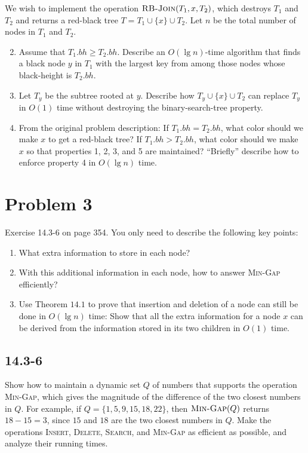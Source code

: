 \documentclass{../../class}
\begin{document}
We wish to implement the operation $\textsc{RB-Join}(T_1, x, T_2)$, which destroys $T_1$ and $T_2$ and returns a red-black tree $T = T_1 \cup \{x\} \cup T_2$. Let $n$ be the total number of nodes in $T_1$ and $T_2$.
\begin{enumerate}[label=\textbf{\textit{\alph*}}.] \setcounter{enumi}{1}
    \item Assume that $T_1.bh \geq T_2.bh$. Describe an $O(\lg{n})$-time algorithm that finds a black node $y$ in $T_1$ with the largest key from among those nodes whose black-height is $T_2.bh$.
    \item Let $T_y$ be the subtree rooted at $y$. Describe how $T_y \cup \{x\} \cup T_2$ can replace $T_y$ in $O(1)$ time without destroying the binary-search-tree property.
    \item From the original problem description: If $T_1.bh = T_2.bh$, what color should we make $x$ to get a red-black tree? If $T_1.bh > T_2.bh$, what color should we make $x$ so that properties 1, 2, 3, and 5 are maintained? \enquote{Briefly} describe how to enforce property 4 in $O(\lg{n})$ time.
\end{enumerate}

\newpage
\section*{Problem 3}
\begin{tcolorbox}
    Exercise 14.3-6 on page 354. You only need to describe the following key points:
    \begin{enumerate}
        \item What extra information to store in each node?
        \item With this additional information in each node, how to answer \textsc{Min-Gap} efficiently?
        \item Use Theorem $14.1$ to prove that insertion and deletion of a node can still be done in $O(\lg{n})$ time: Show that all the extra information for a node $x$ can be derived from the information stored in its two children in $O(1)$ time.
    \end{enumerate}
\end{tcolorbox}

\subsection*{14.3-6}
Show how to maintain a dynamic set $Q$ of numbers that supports the operation \textsc{Min-Gap}, which gives the magnitude of the difference of the two closest numbers in $Q$. For example, if $Q = \{1, 5, 9, 15, 18, 22\}$, then $\textsc{Min-Gap}(Q)$ returns $18-15=3$, since $15$ and $18$ are the two closest numbers in $Q$. Make the operations \textsc{Insert}, \textsc{Delete}, \textsc{Search}, and \textsc{Min-Gap} as efficient as possible, and analyze their running times.
\end{document}
